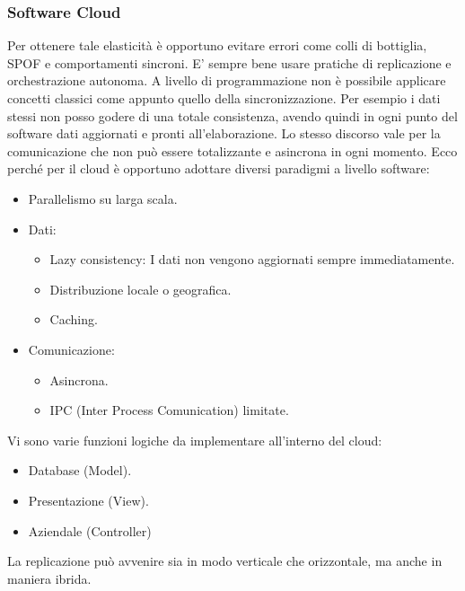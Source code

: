 \documentclass{article}
\begin{document}
		\subsubsection{Software Cloud}
		Per ottenere tale elasticità è opportuno evitare errori come colli di bottiglia, SPOF e comportamenti sincroni. 
		E' sempre bene usare pratiche di replicazione e orchestrazione autonoma.
		A livello di programmazione non è possibile applicare concetti classici come appunto quello della sincronizzazione.
		Per esempio i dati stessi non posso godere di una totale consistenza, avendo quindi in ogni punto del software dati aggiornati e pronti all'elaborazione.
		Lo stesso discorso vale per la comunicazione che non può essere totalizzante e asincrona in ogni momento. 
		Ecco perché per il cloud è opportuno adottare diversi paradigmi a livello software:
		
		\begin{itemize}
		    \item Parallelismo su larga scala.
		    \item Dati:
		    \begin{itemize}
		        \item Lazy consistency: I dati non vengono aggiornati sempre immediatamente.
		        \item Distribuzione locale o geografica.
		        \item Caching.
		    \end{itemize}
		    \item Comunicazione:
		    \begin{itemize}
		        \item Asincrona.
		        \item IPC (Inter Process Comunication) limitate.
		    \end{itemize}
		\end{itemize}
		
		Vi sono varie funzioni logiche da implementare all'interno del cloud:
		\begin{itemize}
		    \item Database (Model).
		    \item Presentazione (View).
		    \item Aziendale (Controller)
		\end{itemize}
		La replicazione può avvenire sia in modo verticale che orizzontale, ma anche in maniera ibrida. 
		
\end{document}
